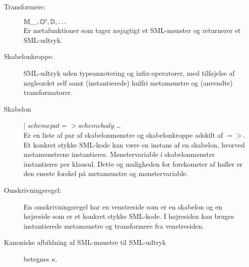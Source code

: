 \documentclass[oneside]{memoir}
\theoremstyle{definition}
\begin{document}
\begin{description}



\item[Transformere:] %
  $\mathbb{M}_{\textnormal{\fontsize{2}{3pt}\selectfont egatron}}, \mathbb{O}',
  \mathbb{D}, \ldots$\\
  Er metafunktioner som tager nøjagtigt et SML-mønster og returnerer
  et SML-udtryk. 

\item[Skabelonkroppe:]
  SML-udtryk uden typeannotering og infix-operatorer, med tilføjelse af
  nøgleordet \textsf{self} samt (instantierede) hulfri metamønstre og (anvendte)
  transformatorer.



\item[Skabelon] | $schemepat => schemebody$ \ldots\\
  Er en liste af par af skabelonmønstre og skabelonkroppe adskilt af $=>$. Et
  konkret stykke SML-kode kan være en instans af en skabelon, hvorved
  metamønstrene instantieres. Mønstervariable i skabelonmønstre instantieres per
  klausul. Dette og muligheden for forekomster af huller er den eneste forskel
  på metamønstre og mønstervariable.

\item[Omskrivningsregel:]
  En omskrivningsregel har en venstreside som er en skabelon og en højreside som
  er et konkret stykke SML-kode. I højresiden kan bruges instantierede
  metamønstre og transformere fra venstresiden.

\item[Kanoniske afbildning af SML-mønstre til SML-udtryk] betegnes $\kappa$.


\end{description}
\end{document}
